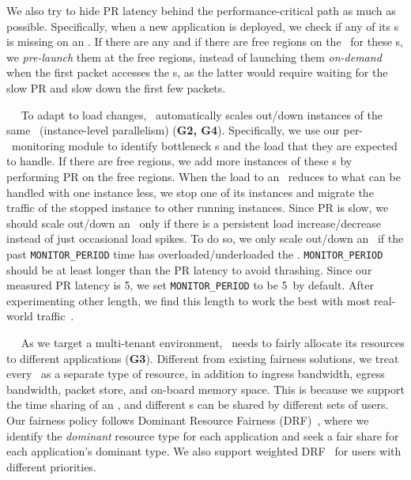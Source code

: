 We also try to hide PR latency behind the performance-critical path as much as possible.
Specifically, when a new application is deployed, we check if any of its \nt{}s is missing on an \snic. If there are any and if there are free regions on the \snic\ for these \nt{}s, we {\em pre-launch} them at the free regions, instead of launching them {\em on-demand} when the first packet accesses the \nt{}s, as the latter would require waiting for the slow PR and slow down the first few packets. 

~~
To adapt to load changes, \snic\ automatically scales out/down instances of the same \nt\ (instance-level parallelism) (\textbf{G2, G4}).
Specifically, we use our per-\nt\ monitoring module to identify bottleneck \nt{}s and the load that they are expected to handle.
If there are free regions, we add more instances of these \nt{}s by performing PR on the free regions.
When the load to an \nt\ reduces to what can be handled with one instance less, we stop one of its instances and migrate the traffic of the stopped instance to other running instances.
Since PR is slow, we should scale out/down an \nt\ only if there is a persistent load increase/decrease instead of just occasional load spikes.
To do so, we only scale out/down an \nt\ if the past \texttt{MONITOR\_PERIOD} time has overloaded/underloaded the \nt.
\texttt{MONITOR\_PERIOD} should be at least longer than the PR latency to avoid thrashing. Since our measured PR latency is 5\ms, we set \texttt{MONITOR\_PERIOD} to be 5\ms\ by default. 
After experimenting other length, we find this length to work the best with most real-world traffic~\cite{facebook-sigcomm15,Atikoglu12-SIGMETRICS}.

~~
As we target a multi-tenant environment, \snic\ needs to fairly allocate its resources to different applications (\textbf{G3}).
Different from existing fairness solutions, we treat every \nt\ as a separate type of resource, in addition to ingress bandwidth, egress bandwidth, packet store, and on-board memory space.
This is because we support the time sharing of an \nt, and different \nt{}s can be shared by different sets of users. Our fairness policy follows Dominant Resource Fairness (DRF)~\cite{DRF}, where we identify the {\em dominant} resource type for each application and seek a fair share for each application's dominant type. We also support weighted DRF~\cite{DRF,beyond-DRF} for users with different priorities.

